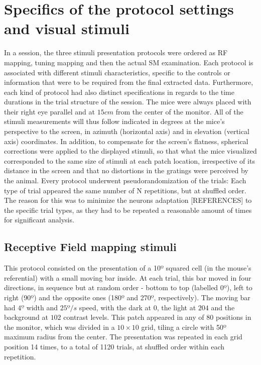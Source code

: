 \section{Specifics of the protocol settings and visual stimuli}
\label{sec:Specifics-of-the-protocol-settings-and-visual-stimuli}

In a session, the three stimuli presentation protocols were ordered as RF mapping, tuning mapping and then the actual SM examination.
Each protocol is associated with different stimuli characteristics, specific to the controls or information that were to be required from the final extracted data. Furthermore, each kind of protocol had also distinct specifications in regards to the time durations in the trial structure of the session.
The mice were always placed with their right eye parallel and at $15 cm$ from the center of the monitor. All of the stimuli measurements will thus follow indicated in degrees at the mice's perspective to the screen, in azimuth (horizontal axis) and in elevation (vertical axis) coordinates. In addition, to compensate for the screen's flatness, spherical corrections were applied to the displayed stimuli, so that what the mice visualized corresponded to the same size of stimuli at each patch location, irrespective of its distance in the screen and that no distortions in the gratings were perceived by the animal.
Every protocol underwent pseudorandomization of the trials: Each type of trial appeared the same number of N repetitions, but at shuffled order. The reason for this was to minimize the neurons adaptation [REFERENCES] to the specific trial types, as they had to be repeated a reasonable amount of times for significant analysis.

\subsection{Receptive Field mapping stimuli}
\label{subsec:subasectionC}

This protocol consisted on the presentation of a 10º squared cell (in the mouse's referential) with a small moving bar inside. At each trial, this bar moved in four directions, in sequence but at random order - bottom to top (labelled 0º), left to right (90º) and the opposite ones (180º and 270º, respectively). The moving bar had $4º$ width and $25 º/s$ speed, with the dark at $0$, the light at $204$ and the background at $102$ contrast levels. This patch appeared in any of 80 positions in the monitor, which was divided in a $10 \times 10$ grid, tiling a circle with 50º maximum radius from the center. The presentation was repeated in each grid position 14 times, to a total of 1120 trials, at shuffled order within each repetition.


